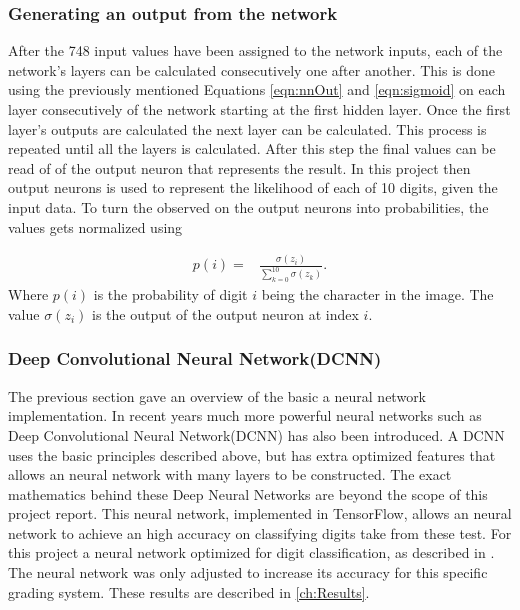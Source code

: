 \subsubsection{Generating an output from the network}
After the 748 input values have been assigned to the network inputs, each of the network's layers can be calculated consecutively one after another. This is done using the previously mentioned Equations \ref{eqn:nnOut} and \ref{eqn:sigmoid} on each layer consecutively of the network starting at the first hidden layer. Once the first layer's outputs are calculated the next layer can be calculated. This process is repeated until all the layers is calculated. After this step the final values can be read of of the output neuron that represents the result. In this project then output neurons is used to represent the likelihood of each of 10 digits, given the input data. To turn the observed on the output neurons into probabilities, the values gets normalized using


\begin{align}
  p(i) =  &\displaystyle{\frac{\sigma(z_{i})}{\sum_{k=0}^{10} \sigma(z_{k})}}.
\label{eqn:normal}
\end{align}
Where $p(i)$ is the probability of digit $i$ being the character in the image. The value $\sigma(z_{i})$ is the output of the output neuron at index $i$.

\subsubsection{Deep Convolutional Neural Network(DCNN)}

The previous section gave an overview of the basic a neural network implementation. In recent years much more powerful neural networks such as Deep Convolutional Neural Network(DCNN) has also been introduced. A DCNN uses the basic principles described above, but has extra optimized features that allows an neural network with many layers to be constructed. The exact mathematics behind these Deep Neural Networks are beyond the scope of this project report. This neural network, implemented in TensorFlow, allows an neural network to achieve an high accuracy on  classifying digits take from these test. For this project a neural network optimized for digit classification, as described in \citet{Tensor}. The neural network was only adjusted to increase its accuracy for this specific grading system. These results are described in \ref{ch:Results}.

